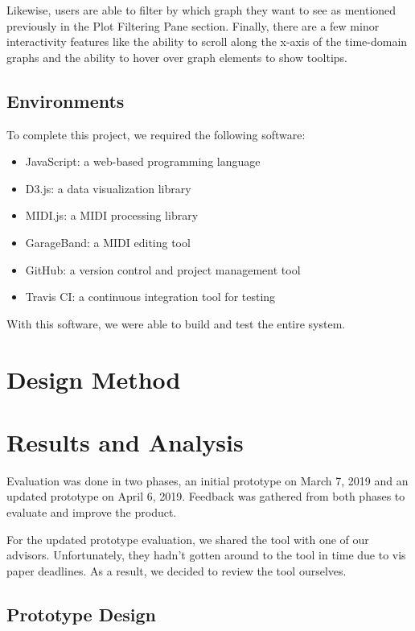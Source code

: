 \documentclass[journal]{vgtc}                %
\begin{document}
Likewise, users are able to filter by which graph they want to see as mentioned
previously in the Plot Filtering Pane section. Finally, there are a few minor
interactivity features like the ability to scroll along the x-axis of the
time-domain graphs and the ability to hover over graph elements to show tooltips.  

\subsection{Environments}

To complete this project, we required the following software:

\begin{itemize}
  \item JavaScript: a web-based programming language
  \item D3.js: a data visualization library
  \item MIDI.js: a MIDI processing library
  \item GarageBand: a MIDI editing tool
  \item GitHub: a version control and project management tool
  \item Travis CI: a continuous integration tool for testing
\end{itemize}

With this software, we were able to build and test the entire system.

\section{Design Method}

\section{Results and Analysis}

Evaluation was done in two phases, an initial prototype on March 7, 2019 and an
updated prototype on April 6, 2019. Feedback was gathered from both phases to
evaluate and improve the product.

For the updated prototype evaluation, we shared the tool with one of our advisors.
Unfortunately, they hadn’t gotten around to the tool in time due to vis paper
deadlines. As a result, we decided to review the tool ourselves.

\subsection{Prototype Design}
\end{document}
